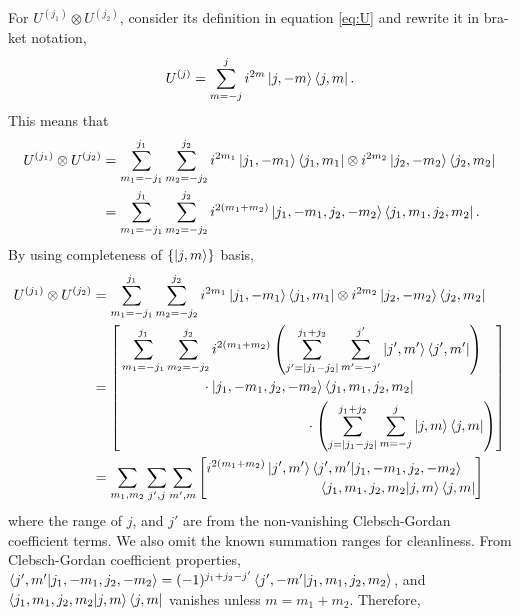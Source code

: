 \documentclass[preprint, 12pt]{revtex4-2}
\numberwithin{equation}{section}
\begin{document}
For $U^{(j_1)}\otimes U^{(j_2)}$, consider its definition in equation \ref{eq:U} and rewrite it in bra-ket notation,
\begin{equation}
    U^{(j)} = \sum_{m=-j}^{j} i^{2m}\ket{j, -m}\bra{j, m}.
\end{equation}
This means that
\begin{equation}
    \begin{aligned}
        U^{(j_1)}\otimes U^{(j_2)} &= \sum_{m_1=-j_1}^{j_1}\sum_{m_2=-j_2}^{j_2} i^{2m_1}\ket{j_1, -m_1}\bra{j_1, m_1}\otimes i^{2m_2}\ket{j_2, -m_2}\bra{j_2, m_2} \\
        &= \sum_{m_1=-j_1}^{j_1}\sum_{m_2=-j_2}^{j_2} i^{2(m_1+m_2)}\ket{j_1, -m_1, j_2, -m_2}\bra{j_1, m_1, j_2, m_2}.
    \end{aligned}
\end{equation}
By using completeness of $\{\ket{j, m}\}$ basis,
\begin{equation}
    \begin{aligned}
        U^{(j_1)}\otimes U^{(j_2)} &= \sum_{m_1=-j_1}^{j_1}\sum_{m_2=-j_2}^{j_2} i^{2m_1}\ket{j_1, -m_1}\bra{j_1, m_1}\otimes i^{2m_2}\ket{j_2, -m_2}\bra{j_2, m_2} \\
        &=  \left[\begin{multlined}
                \sum_{m_1=-j_1}^{j_1}\sum_{m_2=-j_2}^{j_2} i^{2(m_1+m_2)}\left(\sum_{j'=|j_1-j_2|}^{j_1+j_2}\sum_{m'=-j'}^{j'}\ket{j', m'}\bra{j', m'}\right)\\
                \cdot\ket{j_1, -m_1, j_2, -m_2}\bra{j_1, m_1, j_2, m_2}\\
                \cdot\left(\sum_{j=|j_1-j_2|}^{j_1+j_2}\sum_{m=-j}^{j}\ket{j, m}\bra{j, m}\right)
            \end{multlined}\right] \\
        &= \sum_{m_1, m_2}\sum_{j', j}\sum_{m', m}
            \left[\begin{multlined}
                i^{2(m_1+m_2)}\ket{j', m'}\bra{j', m'}\ket{j_1, -m_1, j_2, -m_2}\\
                \bra{j_1, m_1, j_2, m_2}\ket{j, m}\bra{j, m}
            \end{multlined}\right]
    \end{aligned}
\end{equation}
where the range of $j$, and $j'$ are from the non-vanishing Clebsch-Gordan coefficient terms. We also omit the known summation ranges for cleanliness. From Clebsch-Gordan coefficient properties, $\bra{j', m'}\ket{j_1, -m_1, j_2, -m_2}=(-1)^{j_1+j_2-j'}\bra{j', -m'}\ket{j_1, m_1, j_2, m_2}$, and $\bra{j_1, m_1, j_2, m_2}\ket{j, m}\bra{j, m}$ vanishes unless $m=m_1+m_2$. Therefore,
\end{document}
